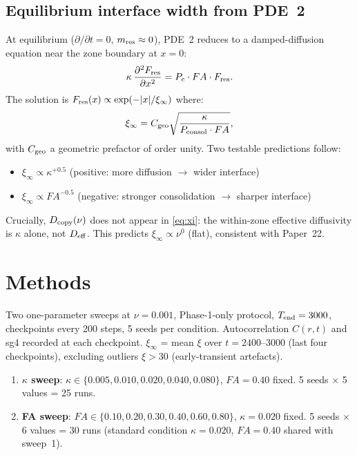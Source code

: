 \documentclass[11pt]{article}
\begin{document}
\subsection{Equilibrium interface width from PDE~2}

At equilibrium ($\partial/\partial t = 0$, $m_{\rm res} \approx 0$),
PDE~2 reduces to a damped-diffusion equation near the zone boundary at $x=0$:
\begin{equation}
  \kappa\,\frac{\partial^2 F_{\rm res}}{\partial x^2}
  = P_c\cdot FA\cdot F_{\rm res}.
\end{equation}
The solution is $F_{\rm res}(x) \propto \exp(-|x|/\xi_\infty)$ where:
\begin{equation}
  \xi_\infty = C_{\rm geo}\sqrt{\frac{\kappa}{P_{\rm consol}\cdot FA}},
  \label{eq:xi}
\end{equation}
with $C_{\rm geo}$ a geometric prefactor of order unity.
Two testable predictions follow:
\begin{itemize}
  \item $\xi_\infty \propto \kappa^{+0.5}$ (positive: more diffusion $\to$ wider interface)
  \item $\xi_\infty \propto FA^{-0.5}$ (negative: stronger consolidation $\to$ sharper interface)
\end{itemize}
Crucially, $D_{\rm copy}(\nu)$ does not appear in \eqref{eq:xi}:
the within-zone effective diffusivity is $\kappa$ alone, not $D_{\rm eff}$.
This predicts $\xi_\infty \propto \nu^0$ (flat), consistent with Paper~22.

\section{Methods}

Two one-parameter sweeps at $\nu=0.001$, Phase-1-only protocol,
$T_{\rm end}=3000$, checkpoints every 200 steps, 5 seeds per condition.
Autocorrelation $C(r,t)$ and sg4 recorded at each checkpoint.
$\xi_\infty$ = mean $\xi$ over $t=2400$--$3000$ (last four checkpoints),
excluding outliers $\xi>30$ (early-transient artefacts).

\begin{enumerate}
  \item \textbf{$\kappa$ sweep}: $\kappa \in \{0.005, 0.010, 0.020, 0.040, 0.080\}$,
    $FA=0.40$ fixed. 5 seeds $\times$ 5 values = 25 runs.
  \item \textbf{FA sweep}: $FA \in \{0.10, 0.20, 0.30, 0.40, 0.60, 0.80\}$,
    $\kappa=0.020$ fixed. 5 seeds $\times$ 6 values = 30 runs (standard
    condition $\kappa=0.020$, $FA=0.40$ shared with sweep~1).
\end{enumerate}
\end{document}
